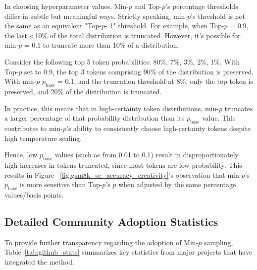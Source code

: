 \documentclass{article}
\begin{document}
In choosing hyperparameter values, Min-\(p\) and Top-\(p\)'s percentage thresholds differ in subtle but meaningful ways. Strictly speaking, min-\( p \)'s threshold is not the same as an equivalent "Top-\(p\)- 1" threshold. For example, when Top-\(p\) = 0.9, the last <10\% of the total distribution is truncated. However, it's possible for min-\( p \) = 0.1 to truncate more than 10\% of a distribution.

Consider the following top 5 token probabilities: 80\%, 7\%, 3\%, 2\%, 1\%. With Top-\(p\) set to 0.9, the top 3 tokens comprising 90\% of the distribution is preserved. With min-\( p \) \( p_{\text{base}} \) = 0.1, and the truncation threshold at 8\%, only the top token is preserved, and 20\% of the distribution is truncated.

In practice, this means that in high-certainty token distributions, min-\( p \) truncates a larger percentage of that probability distribution than its \( p_{\text{base}} \) value. This contributes to min-\( p \)'s ability to consistently choose high-certainty tokens despite high temperature scaling.

Hence, low \( p_{\text{base}} \) values (such as from 0.01 to 0.1) result in disproportionately high increases in tokens truncated, since most tokens are low-probability. This results in Figure ~\ref{fig:gsm8k_sc_accuracy_creativity}'s observation that min-\( p \)'s \( p_{\text{base}} \) is more sensitive than Top-\(p\)'s \( p \) when adjusted by the same percentage values/basis points.

\subsection{Detailed Community Adoption Statistics}
\label{sec:adoption-stats}

To provide further transparency regarding the adoption of Min‑\( p \) sampling, Table~\ref{tab:github_stats} summarizes key statistics from major projects that have integrated the method.
\end{document}
